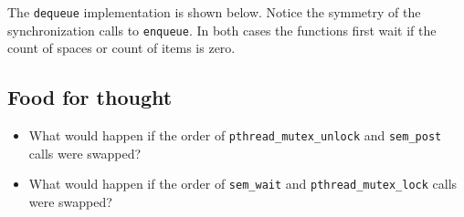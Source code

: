 The \texttt{dequeue} implementation is shown below. Notice the symmetry
of the synchronization calls to \texttt{enqueue}. In both cases the
functions first wait if the count of spaces or count of items is zero.

\begin{Shaded}
\begin{Highlighting}[]
 

   \NormalTok{*result = b[(out++) & (N}\NormalTok{)]}


   
\NormalTok{\}}
\end{Highlighting}
\end{Shaded}

\subsection{Food for thought}\label{food-for-thought}

\begin{itemize}
\itemsep1pt\parskip0pt
\item
  What would happen if the order of \texttt{pthread\_mutex\_unlock} and
  \texttt{sem\_post} calls were swapped?
\item
  What would happen if the order of \texttt{sem\_wait} and
  \texttt{pthread\_mutex\_lock} calls were swapped?
\end{itemize}
